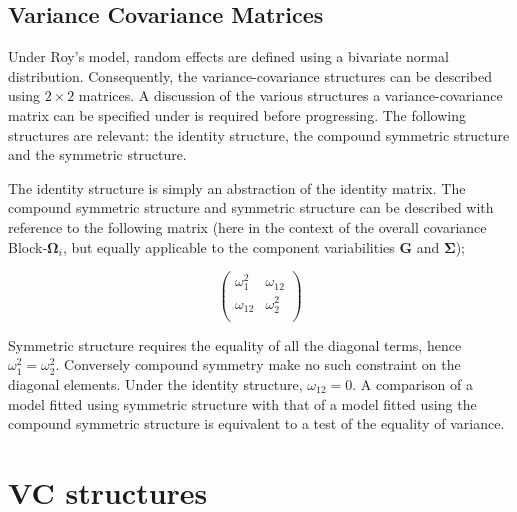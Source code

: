 \documentclass[12pt, a4paper]{report}
\theoremstyle{plain}
\theoremstyle{definition}
\theoremstyle{remark}
\begin{document}
		\newpage

	\subsection{Variance Covariance Matrices }
	
	Under Roy's model, random effects are defined using a bivariate normal distribution. Consequently, the variance-covariance structures can be described using $2 \times 2$  matrices. A discussion of the various structures a variance-covariance matrix can be specified under is required before progressing. The following structures are relevant: the identity structure, the compound symmetric structure and the symmetric structure.
	
	The identity structure is simply an abstraction of the identity matrix. The compound symmetric structure and symmetric structure can be described with reference to the following matrix (here in the context of the overall covariance Block-$\boldsymbol{\Omega}_i$, but equally applicable to the component variabilities $\boldsymbol{G}$ and $\boldsymbol{\Sigma}$);
	
	\[\left( \begin{array}{cc}
	\omega^2_1  & \omega_{12} \\
	\omega_{12} & \omega^2_2 \\
	\end{array}\right) \]
	
	Symmetric structure requires the equality of all the diagonal terms, hence $\omega^2_1 = \omega^2_2$. Conversely compound symmetry make no such constraint on the diagonal elements. Under the identity structure, $\omega_{12} = 0$.
	A comparison of a model fitted using symmetric structure with that of a model fitted using the compound symmetric structure is equivalent to a test of the equality of variance.
	
	
	
	

	\section{VC structures}
\end{document}
